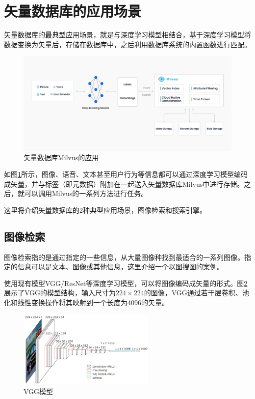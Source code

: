 \section{矢量数据库的应用场景}

矢量数据库的最典型应用场景，就是与深度学习模型相结合，基于深度学习模型将数据变换为矢量后，存储在数据库中，之后利用数据库系统的内置函数进行匹配。

\begin{figure}[H]
    \includegraphics[width=\textwidth]{examples/milvus.jpg}
    \centering
    \caption{矢量数据库Milvus的应用}
    \label{fig:milvus}
\end{figure}

如图\ref{fig:milvus}所示，图像、语音、文本甚至用户行为等信息都可以通过深度学习模型编码成矢量，并与标签（即元数据）附加在一起送入矢量数据库Milvus中进行存储。之后，就可以调用Milvus的一系列方法进行任务。

这里将介绍矢量数据库的2种典型应用场景，图像检索和搜索引擎。

\subsection{图像检索}

图像检索指的是通过指定的一些信息，从大量图像种找到最适合的一系列图像。指定的信息可以是文本、图像或其他信息，这里介绍一个以图搜图的案例。

使用现有模型VGG\cite{simonyan2014very}/ResNet\cite{he2016deep}等深度学习模型，可以将图像编码成矢量的形式。图\ref{fig:vgg}展示了VGG的模型结构，输入尺寸为$224\times 224$的图像，VGG通过若干层卷积、池化和线性变换操作将其映射到一个长度为4096的矢量。

\begin{figure}[H]
    \includegraphics[width=0.6\textwidth]{examples/vgg.png}
    \centering
    \caption{VGG模型}
    \label{fig:vgg}
\end{figure}


